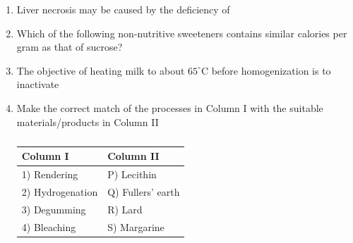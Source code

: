 \documentclass[a4paper,10pt]{article}
\begin{document}
\begin{enumerate}
    \item Liver necrosis may be caused by the deficiency of
    
    \hfill{}
    \begin{enumerate}[label=\Alph*)]
    \end{enumerate}
    
    \item Which of the following non-nutritive sweeteners contains similar calories per gram as that of sucrose?
    
    \hfill{}
    \begin{enumerate}[label=\Alph*)]
    \end{enumerate}
    
    \item The objective of heating milk to about $65^\circ$C before homogenization is to inactivate
    
    \hfill{}
    \begin{enumerate}[label=\Alph*)]
    \end{enumerate}
    
    \item Make the correct match of the processes in Column I with the suitable materials/products in Column II
    \begin{table}[h!] \centering \caption*{} \label{tab:q7_food}
        \begin{tabular}{ll} \hline
            \textbf{Column I} & \textbf{Column II} \\ \hline
            1) Rendering & P) Lecithin \\
            2) Hydrogenation & Q) Fullers' earth \\
            3) Degumming & R) Lard \\
            4) Bleaching & S) Margarine \\ \hline
        \end{tabular}
    \end{table}
    

\end{enumerate}
\end{document}
